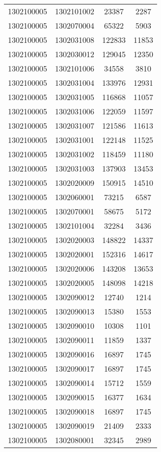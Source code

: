 \begin{longtable}[h]{llcc}
		1302100005 & 1302101002 & 23387 & 2287\\
		1302100005 & 1302070004 & 65322 & 5903\\
		1302100005 & 1302031008 & 122833 & 11853\\
		1302100005 & 1302030012 & 129045 & 12350\\
		1302100005 & 1302101006 & 34558 & 3810\\
		1302100005 & 1302031004 & 133976 & 12931\\
		1302100005 & 1302031005 & 116868 & 11057\\
		1302100005 & 1302031006 & 122059 & 11597\\
		1302100005 & 1302031007 & 121586 & 11613\\
		1302100005 & 1302031001 & 122148 & 11525\\
		1302100005 & 1302031002 & 118459 & 11180\\
		1302100005 & 1302031003 & 137903 & 13453\\
		1302100005 & 1302020009 & 150915 & 14510\\
		1302100005 & 1302060001 & 73215 & 6587\\
		1302100005 & 1302070001 & 58675 & 5172\\
		1302100005 & 1302101004 & 32284 & 3436\\
		1302100005 & 1302020003 & 148822 & 14337\\
		1302100005 & 1302020001 & 152316 & 14617\\
		1302100005 & 1302020006 & 143208 & 13653\\
		1302100005 & 1302020005 & 148098 & 14218\\
		1302100005 & 1302090012 & 12740 & 1214\\
		1302100005 & 1302090013 & 15380 & 1553\\
		1302100005 & 1302090010 & 10308 & 1101\\
		1302100005 & 1302090011 & 11859 & 1337\\
		1302100005 & 1302090016 & 16897 & 1745\\
		1302100005 & 1302090017 & 16897 & 1745\\
		1302100005 & 1302090014 & 15712 & 1559\\
		1302100005 & 1302090015 & 16377 & 1634\\
		1302100005 & 1302090018 & 16897 & 1745\\
		1302100005 & 1302090019 & 21409 & 2333\\
		1302100005 & 1302080001 & 32345 & 2989\\

\end{longtable}

